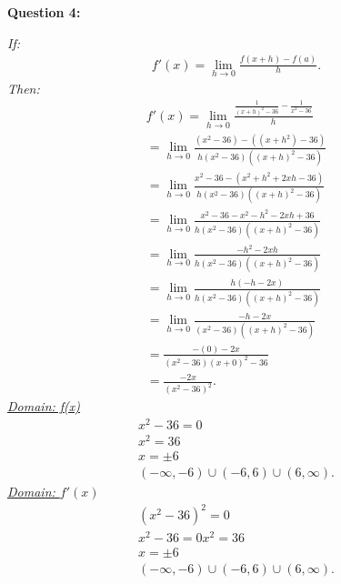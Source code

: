 \documentclass{report}
\begin{document}
    \bigbreak \noindent \bigbreak \noindent \bigbreak \noindent 
    \begin{Large}
        \textbf{Question 4:}
    \end{Large}
    \bigbreak \noindent 
    \bigbreak \noindent 
    \textit{If:}
    \begin{align*}
      f\prime(x) = \lim\limits_{h \to 0}{ \frac{f(x+h) - f(a)}{h}}
    .\end{align*}
    \bigbreak \noindent 
    \textit{Then:}
    \begin{align*}
      f\prime(x) = \lim\limits_{h \to 0}{ \frac{ \frac{1}{(x+h)^2-36} -  \frac{1}{x^2-36}}{h}} \\ 
      = \lim\limits_{h \to 0}{ \frac{(x^2-36) - ((x+h^2) - 36)}{h(x^2-36)((x+h)^2-36)}} \\ 
      = \lim\limits_{h \to 0}{ \frac{ x^2-36 - (x^2+h^2+2xh-36)}{h(x^2-36)((x+h)^2-36)}} \\ 
      = \lim\limits_{h \to 0}{ \frac{x^2-36-x^2-h^2-2xh+36}{h(x^2-36)((x+h)^2-36)}} \\ 
      = \lim\limits_{h \to 0}{ \frac{-h^2-2xh}{h(x^2-36)((x+h)^2-36)}} \\ 
      = \lim\limits_{h \to 0}{ \frac{h(-h-2x)}{h(x^2-36)((x+h)^2-36)}} \\
      = \lim\limits_{h \to 0}{ \frac{-h-2x}{(x^2-36)((x+h)^2-36)}} \\ 
      = \frac{-(0) - 2x}{(x^2-36)(x+0)^2-36} \\ 
      = \frac{-2x}{(x^2-36)^2}
    .\end{align*}
    \bigbreak \noindent 
    \textit{\underline{Domain: f(x)}}  
    \begin{align*}
      x^2-36=0 \\ 
       x^2=36 \\
      x = \pm 6 \\ 
      (- \infty, -6) \cup (-6,6) \cup (6, \infty)
    .\end{align*}
    \bigbreak \noindent 
    \textit{\underline{Domain: $f\prime(x)$}}
    \begin{align*}
      (x^2-36)^2 = 0 \\
      x^2-36 = 0
      x^2=36 \\
      x = \pm 6 \\ 
      (- \infty, -6) \cup (-6,6) \cup (6, \infty)
    .\end{align*}
\end{document}
